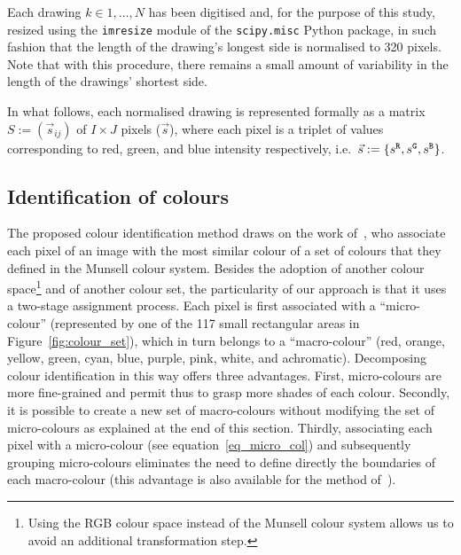 \documentclass[11pt,a4paper]{article}
\begin{document}
Each drawing $k \in 1,\dots, N$ has been digitised and, for the purpose of this study, resized using the {\tt imresize} module of the {\tt scipy.misc} Python package, in such fashion that the length of the drawing's longest side is normalised to 320 pixels. Note that with this procedure, there remains a small amount of variability in the length of the drawings' shortest side. 

In what follows, each normalised drawing is represented formally as a matrix $S := (\vec{s}_{ij})$ of $I \times J$ pixels ($\vec{s}$), where each pixel is a triplet of values corresponding to red, green, and blue intensity respectively, i.e.~$\vec{s} := \{ s^{\tt \scriptstyle R}, s^{\tt \scriptstyle G}, s^{\tt \scriptstyle B} \}$.

\subsection{Identification of colours}
\label{sec:identification}

The proposed colour identification method draws on the work of~\citet{kimbaelee2007}, who associate each pixel of an image with the most similar colour of a set of colours that they defined in the Munsell colour system. 
Besides the adoption of another colour space\footnote{Using the RGB colour space instead of the Munsell colour system allows us to avoid an additional transformation step.} and of another colour set, the particularity of our approach is that it uses a two-stage assignment process. Each pixel is first associated with a ``micro-colour'' (represented by one of the 117 small rectangular areas in Figure~\ref{fig:colour_set}), which in turn belongs to a ``macro-colour'' (red, orange, yellow, green, cyan, blue, purple, pink, white, and achromatic). Decomposing colour identification in this way offers three advantages. First, micro-colours are more fine-grained and permit thus to grasp more shades of each colour. Secondly, it is possible to create a new set of macro-colours without modifying the set of micro-colours as explained at the end of this section. Thirdly, associating each pixel with a micro-colour (see equation~\eqref{eq_micro_col}) and subsequently grouping micro-colours eliminates the need to define directly the boundaries of each macro-colour (this advantage is also available for the method of~\citet{kimbaelee2007}).
\end{document}
